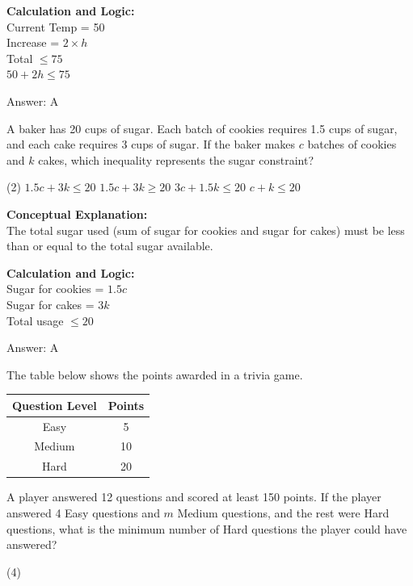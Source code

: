 \documentclass[11pt,paper=a4,answers]{exam}
\begin{document}
\begin{questions}
\begin{solution}
\vspace{10pt}
\textbf{Calculation and Logic:} \\
Current Temp = 50 \\
Increase = $2 \times h$ \\
Total $\le 75$ \\
$50 + 2h \le 75$

\vspace{15pt}
Answer: \colorbox{yellow!100}{A}
\end{solution}

\vspace{20pt}

\question
A baker has 20 cups of sugar. Each batch of cookies requires 1.5 cups of sugar, and each cake requires 3 cups of sugar. If the baker makes $c$ batches of cookies and $k$ cakes, which inequality represents the sugar constraint?
\begin{tasks}(2)
    \task $1.5c + 3k \le 20$
    \task $1.5c + 3k \ge 20$
    \task $3c + 1.5k \le 20$
    \task $c + k \le 20$
\end{tasks}

\begin{solution}
\textbf{Conceptual Explanation:} \\
The total sugar used (sum of sugar for cookies and sugar for cakes) must be less than or equal to the total sugar available.

\vspace{10pt}
\textbf{Calculation and Logic:} \\
Sugar for cookies = $1.5c$ \\
Sugar for cakes = $3k$ \\
Total usage $\le 20$

\vspace{15pt}
Answer: \colorbox{yellow!100}{A}
\end{solution}

\vspace{20pt}

\question
The table below shows the points awarded in a trivia game.
\begin{center}
\begin{tabular}{|c|c|}
\hline
\textbf{Question Level} & \textbf{Points} \\ \hline
Easy & 5 \\ \hline
Medium & 10 \\ \hline
Hard & 20 \\ \hline
\end{tabular}
\end{center}
A player answered 12 questions and scored at least 150 points. If the player answered 4 Easy questions and $m$ Medium questions, and the rest were Hard questions, what is the minimum number of Hard questions the player could have answered?
\begin{tasks}(4)
\end{tasks}


\end{questions}
\end{document}
